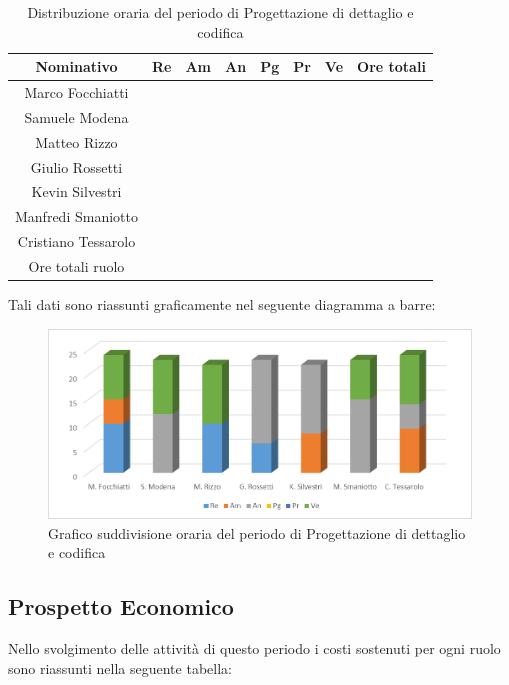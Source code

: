 \documentclass[./PianodiProgetto.tex]{subfiles}
\begin{document}
\begin{table}[H]
	\centering
	\begin{tabular}{|c|cccccc|c|}
		\hline
		Nominativo&Re&Am&An&Pg&Pr&Ve&Ore totali\\ \hline
		Marco Focchiatti& & & & & & & \\ \hline
		Samuele Modena& & & & & & & \\ \hline
		Matteo Rizzo& & & & & & & \\ \hline
		Giulio Rossetti& & & & & & & \\ \hline
		Kevin Silvestri& & & & & & & \\ \hline
		Manfredi Smaniotto& & & & & & & \\ \hline
		Cristiano Tessarolo& & & & & & & \\  \hline
		Ore totali ruolo& & & & & & & \\ \hline
	\end{tabular}
	\caption{Distribuzione oraria del periodo di Progettazione di dettaglio e codifica}
\end{table}

Tali dati sono riassunti graficamente nel seguente diagramma a barre:
\begin{figure}[H]
	\centering
	\includegraphics[width=1\linewidth]{img/grafici/ProgettazioneDettaglioCodificaProspettoOrario}
	\caption{Grafico suddivisione oraria del periodo di Progettazione di dettaglio e codifica}
	\label{fig:progettazione-dettaglio-codifica-prospetto-orario}
\end{figure}

\subsection{Prospetto Economico}
Nello svolgimento delle attività di questo periodo i costi sostenuti per ogni ruolo sono riassunti nella seguente tabella:
\end{document}
